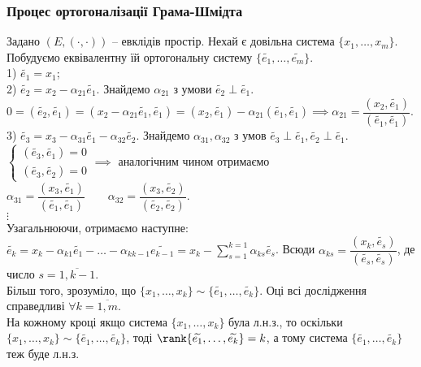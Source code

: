 \documentclass[a4paper, 10pt]{article}
\theoremstyle{theoremdd}
\begin{document}
\subsubsection*{Процес ортогоналізації Грама-Шмідта}
Задано $(E,(\cdot,\cdot))$ -- евклідів простір. Нехай є довільна система $\{x_1,\dots,x_m\}$. Побудуємо еквівалентну їй ортогональну систему $\{\widetilde{e_1},\dots, \widetilde{e_m} \}$.\\
1) $\widetilde{e_1}=x_1$;\\
2) $\widetilde{e_2} = x_2 - \alpha_{21} \widetilde{e_1}$. Знайдемо $\alpha_{21}$ з умови $\widetilde{e_2} \perp \widetilde{e_1}$.\\
$0 = (\widetilde{e_2}, \widetilde{e_1}) = (x_2-\alpha_{21}\widetilde{e_1}, \widetilde{e_1}) = (x_2, \widetilde{e_1})-\alpha_{21} (\widetilde{e_1},\widetilde{e_1}) \implies \alpha_{21} = \dfrac{(x_2,\widetilde{e_1})}{(\widetilde{e_1},\widetilde{e_1})}$.\\
3) $\widetilde{e_3} = x_3 - \alpha_{31} \widetilde{e_1} - \alpha_{32} \widetilde{e_2}$. Знайдемо $\alpha_{31}, \alpha_{32}$ з умов $\widetilde{e_3} \perp \widetilde{e_1}, \widetilde{e_2} \perp \widetilde{e_1}$.\\
$\begin{cases}
(\widetilde{e_3}, \widetilde{e_1}) = 0 \\
(\widetilde{e_3}, \widetilde{e_2}) = 0
\end{cases}
\implies$
аналогічним чином отримаємо $\alpha_{31} = \dfrac{(x_3, \widetilde{e_1})}{(\widetilde{e_1},\widetilde{e_1})} \qquad \alpha_{32} = \dfrac{(x_3, \widetilde{e_2})}{(\widetilde{e_2},\widetilde{e_2})}$.\\
$\vdots$\\
Узагальнюючи, отримаємо наступне:\\
$\widetilde{e_k} = x_k - \alpha_{k1} \widetilde{e_1} - \dots - \alpha_{k k-1} \widetilde{e_{k-1}} = x_k - \displaystyle\sum_{s=1}^{k=1} \alpha_{ks} \widetilde{e_s}$. Всюди $\alpha_{ks} = \dfrac{(x_k, \widetilde{e_s})}{(\widetilde{e_s},\widetilde{e_s})}$, де число $s = \overline{1,k-1}$. \\
Більш того, зрозуміло, що $\{x_1,\dots,x_k\} \sim \{\widetilde{e_1},\dots, \widetilde{e_k}\}$. Оці всі дослідження справедливі $\forall k = \overline{1,m}$.
\bigskip \\
На кожному кроці якщо система $\{x_1,\dots,x_k\}$ була л.н.з., то оскільки $\{x_1,\dots,x_k\} \sim \{\widetilde{e_1},\dots,\widetilde{e_k}\}$, тоді $\rank \{\widetilde{e_1},\dots,\widetilde{e_k}\} = k$, а тому система $\{\widetilde{e_1},\dots,\widetilde{e_k}\}$ теж буде л.н.з.
\end{document}
